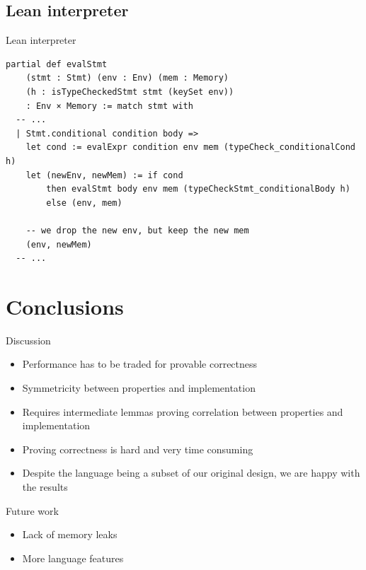 \documentclass{EESD}
\begin{document}
\subsection{Lean interpreter}
\begin{frame}[fragile]{Lean interpreter}

    \begin{lstlisting}[language=lean]
partial def evalStmt
    (stmt : Stmt) (env : Env) (mem : Memory)
    (h : isTypeCheckedStmt stmt (keySet env))
    : Env × Memory := match stmt with
  -- ...
  | Stmt.conditional condition body =>
    let cond := evalExpr condition env mem (typeCheck_conditionalCond h)
    let (newEnv, newMem) := if cond
        then evalStmt body env mem (typeCheckStmt_conditionalBody h)
        else (env, mem)

    -- we drop the new env, but keep the new mem
    (env, newMem)
  -- ...
\end{lstlisting}

\end{frame}

\section{Conclusions}


\begin{frame}{Discussion}
    \begin{itemize}
        \item Performance has to be traded for provable correctness 
        \item Symmetricity between properties and implementation 
        \item Requires intermediate lemmas proving correlation between properties and implementation 
        \item Proving correctness is hard and very time consuming
        \item Despite the language being a subset of our original design, we are happy with the results
    \end{itemize}
\end{frame}

\begin{frame}{Future work}
    \begin{itemize}
        \item Lack of memory leaks 
        \item More language features 
    \end{itemize}
\end{frame}

\end{document}
